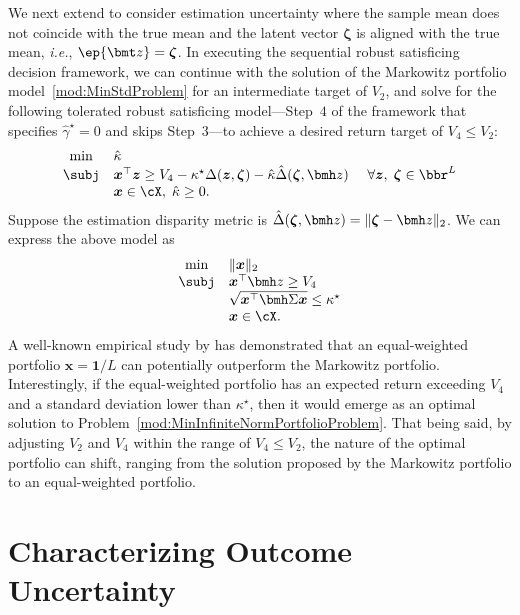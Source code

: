 \documentclass[mnsc, nonblindrev]{informswp}
\newcommand{\1}[1]{\mathds{1}{\left(#1\right)}}
\begin{document}
We next extend to consider estimation uncertainty where the sample mean does not coincide with the true mean and the latent vector $\bm \zeta$ is aligned with the true mean, \textit{i.e.}, $\ep{\bmt z} = \bm \zeta$. In executing the sequential robust satisficing decision framework, we can continue with the solution of the Markowitz portfolio model~\eqref{mod:MinStdProblem} for an intermediate target of $V_2$, and solve for the following tolerated robust satisficing model---Step~$4$ of the framework that specifies $\hat \gamma^\star = 0$ and skips Step~$3$---to achieve a desired return target of $V_4 \leq V_2$:
$$
\begin{array}{cll}
\min & \hat \kappa \\
\subj& \bm x^\top \bm z  \geq V_4 - \kappa^\star \Delta(\bm z,\bm \zeta) - \hat \kappa \hat \Delta(\bm \zeta,\bmh z) &~\forall \bm z, \; \bm \zeta \in \bbr^L \\
& \bm x \in \cX, \; \hat \kappa \geq 0.
\end{array}
$$
Suppose the estimation disparity metric is $\hat \Delta(\bm \zeta,\bmh z) = \|\bm \zeta -\bmh z \|_2$. We can express the above model as
\begin{equation}
\label{mod:MinInfiniteNormPortfolioProblem}    
\begin{array}{cll}
\min & \displaystyle  \|\bm x\|_2 \\
\subj & \bm x^\top \bmh z \geq V_4 \\
& \sqrt{\bm x^\top \bmh \Sigma \bm x} \leq \kappa^\star \\
& \bm x \in \cX.
\end{array}
\end{equation}
A well-known empirical study by \cite{demiguel2009optimal} has demonstrated that an equal-weighted portfolio $\bm x = \bm 1/L$ can potentially outperform the Markowitz portfolio. Interestingly, if the equal-weighted portfolio has an expected return exceeding $V_4$ and a standard deviation lower than $\kappa^\star$, then it would emerge as an optimal solution to Problem~\eqref{mod:MinInfiniteNormPortfolioProblem}. That being said, by adjusting $V_2$ and $V_4$ within the range of $V_4 \leq V_2$, the nature of the optimal portfolio can shift, ranging from the solution proposed by the Markowitz portfolio to an equal-weighted portfolio. 

\section{Characterizing Outcome Uncertainty}\label{sec:OutcomeUncertaintyData}
\end{document}
